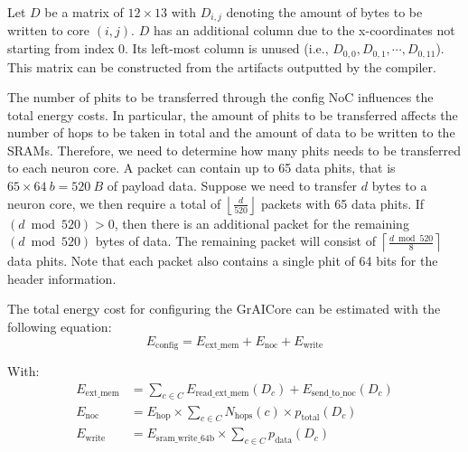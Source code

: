 Let $D$ be a matrix of $12 \times 13$ with $D_{i,j}$ denoting the amount of bytes to be written to core $\left( i,j \right)$.
$D$ has an additional column due to the x-coordinates not starting from index $0$.
Its left-most column is unused (i.e., $D_{0,0}, D_{0,1}, \cdots, D_{0,11}$).
This matrix can be constructed from the artifacts outputted by the compiler.

The number of phits to be transferred through the config NoC influences the total energy costs.
In particular, the amount of phits to be transferred affects the number of hops to be taken in total and the amount of data to be written to the SRAMs.
Therefore, we need to determine how many phits needs to be transferred to each neuron core.
A packet can contain up to 65 data phits, that is $65 \times \SI{64}{b} = \SI{520}{B}$ of payload data.
Suppose we need to transfer $d$ bytes to a neuron core, we then require a total of $\left\lfloor \frac{d}{520} \right\rfloor$ packets with 65 data phits.
If $\left( d \bmod 520 \right) > 0$, then there is an additional packet for the remaining $\left( d \bmod 520 \right)$ bytes of data.
The remaining packet will consist of $\left\lceil \frac{d \bmod 520}{8}\right\rceil$ data phits.
Note that each packet also contains a single phit of 64 bits for the header information.


The total energy cost for configuring the GrAICore can be estimated with the following equation:
\begin{equation}
    E_{\textrm{config}} = E_{\textrm{ext\_mem}} + E_{\textrm{noc}} + E_{\textrm{write}}
\end{equation}

With:
\begin{align*} 
E_{\textrm{ext\_mem}} &= 
        \sum_{c \in C}^{}{E_\textrm{read\_ext\_mem}(D_c) + E_{\textrm{send\_to\_noc}}(D_c)} \\
E_{\textrm{noc}} &=
    E_{\textrm{hop}} \times \sum_{c \in C}^{}{N_\textrm{hops}(c) \times p_{\textrm{total}}(D_c)} \\
E_{\textrm{write}} &=
    E_{\textrm{sram\_write\_64b}} \times \sum_{c \in C}^{}{p_{\textrm{data}}(D_c)}
\end{align*}

